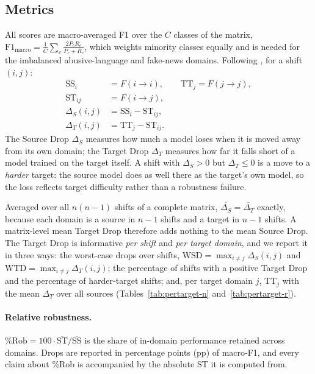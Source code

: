 \documentclass[acmsmall,screen]{acmart}
\newcommand{\dS}{\Delta_S}
\newcommand{\dT}{\Delta_T}
\begin{document}
\subsection{Metrics}\label{sec:metrics}
All scores are macro-averaged F1 over the $C$ classes of the matrix, $\text{F1}_\text{macro}=\frac{1}{C}\sum_{c}\frac{2P_cR_c}{P_c+R_c}$, which weights minority classes equally and is needed for the imbalanced abusive-language and fake-news domains. Following \citet{calderon2024measuring}, for a shift $(i,j)$:
\begin{align}
\text{SS}_i &= F(i\to i), \qquad \text{TT}_j = F(j\to j),\\
\text{ST}_{ij} &= F(i\to j),\\
\dS(i,j) &= \text{SS}_i - \text{ST}_{ij},\\
\dT(i,j) &= \text{TT}_j - \text{ST}_{ij}.
\end{align}
The Source Drop $\dS$ measures how much a model loses when it is moved away from its own domain; the Target Drop $\dT$ measures how far it falls short of a model trained on the target itself. A shift with $\dS>0$ but $\dT\le 0$ is a move to a \emph{harder} target: the source model does as well there as the target's own model, so the loss reflects target difficulty rather than a robustness failure.

Averaged over all $n(n-1)$ shifts of a complete matrix, $\overline{\dS}=\overline{\dT}$ exactly, because each domain is a source in $n-1$ shifts and a target in $n-1$ shifts. A matrix-level mean Target Drop therefore adds nothing to the mean Source Drop. The Target Drop is informative \emph{per shift} and \emph{per target domain}, and we report it in three ways: the worst-case drops over shifts, $\text{WSD}=\max_{i\neq j}\dS(i,j)$ and $\text{WTD}=\max_{i\neq j}\dT(i,j)$; the percentage of shifts with a positive Target Drop and the percentage of harder-target shifts; and, per target domain $j$, $\text{TT}_j$ with the mean $\dT$ over all sources (Tables~\ref{tab:pertarget-n} and~\ref{tab:pertarget-r}).

\paragraph{Relative robustness.} $\%\text{Rob}=100\cdot\overline{\text{ST}}/\overline{\text{SS}}$ is the share of in-domain performance retained across domains. Drops are reported in percentage points (pp) of macro-F1, and every claim about \%Rob is accompanied by the absolute ST it is computed from.
\end{document}
